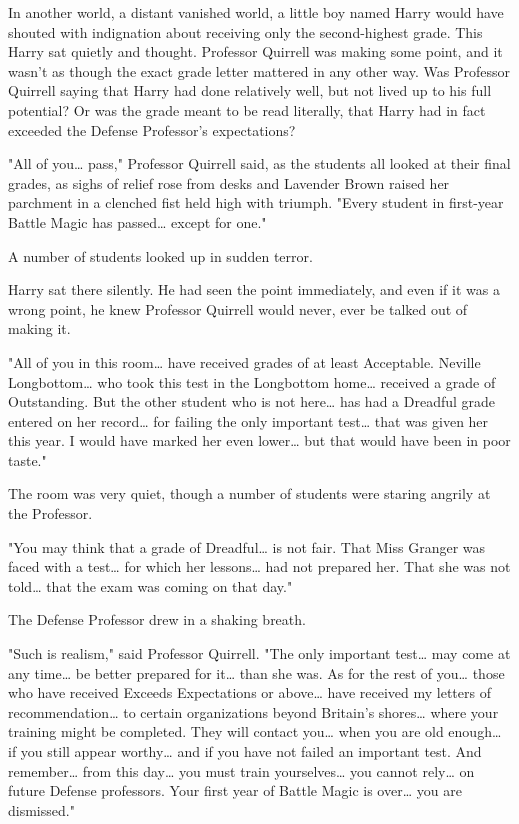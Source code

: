 In another world, a distant vanished world, a little boy named Harry would have 
shouted with indignation about receiving only the second-highest grade. This 
Harry sat quietly and thought. Professor Quirrell was making some point, and it 
wasn't as though the exact grade letter mattered in any other way. Was 
Professor Quirrell saying that Harry had done relatively well, but not lived up 
to his full potential? Or was the grade meant to be read literally, that Harry 
had in fact exceeded the Defense Professor's expectations?

"All of you{\ldots} pass," Professor Quirrell said, as the students all looked 
at their final grades, as sighs of relief rose from desks and Lavender Brown 
raised her parchment in a clenched fist held high with triumph. "Every student 
in first-year Battle Magic has passed{\ldots} except for one."

A number of students looked up in sudden terror.

Harry sat there silently. He had seen the point immediately, and even if it was 
a wrong point, he knew Professor Quirrell would never, ever be talked out of 
making it.

"All of you in this room{\ldots} have received grades of at least Acceptable. 
Neville Longbottom{\ldots} who took this test in the Longbottom home{\ldots} 
received a grade of Outstanding. But the other student who is not here{\ldots} 
has had a Dreadful grade entered on her record{\ldots} for failing the only 
important test{\ldots} that was given her this year. I would have marked her 
even lower{\ldots} but that would have been in poor taste."

The room was very quiet, though a number of students were staring angrily at 
the Professor.

"You may think that a grade of Dreadful{\ldots} is not fair. That Miss Granger 
was faced with a test{\ldots} for which her lessons{\ldots} had not prepared 
her. That she was not told{\ldots} that the exam was coming on that day."

The Defense Professor drew in a shaking breath.

"Such is realism," said Professor Quirrell. "The only important test{\ldots} 
may come at any time{\ldots} be better prepared for it{\ldots} than she was. As 
for the rest of you{\ldots} those who have received Exceeds Expectations or 
above{\ldots} have received my letters of recommendation{\ldots} to certain 
organizations beyond Britain's shores{\ldots} where your training might be 
completed. They will contact you{\ldots} when you are old enough{\ldots} if you 
still appear worthy{\ldots} and if you have not failed an important test. And 
remember{\ldots} from this day{\ldots} you must train yourselves{\ldots} you 
cannot rely{\ldots} on future Defense professors. Your first year of Battle 
Magic is over{\ldots} you are dismissed."

